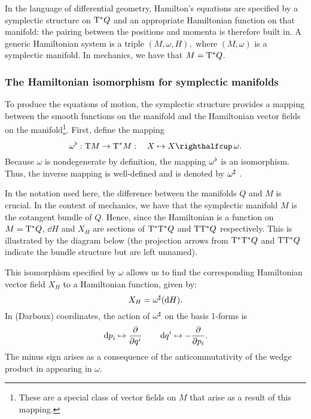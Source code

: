 In the language of differential geometry, Hamilton's equations are specified by a symplectic structure on \(\mathrm{T}^*Q\) and an appropriate Hamiltonian function on that manifold: the pairing between the positions and momenta is therefore built in. A generic Hamiltonian system is a triple \( (M, \omega, H), \) where \( (M, \omega) \) is a symplectic manifold. In mechanics, we have that \( M = \mathrm{T}^*Q \).

\subsubsection{The Hamiltonian isomorphism for symplectic manifolds}
To produce the equations of motion, the symplectic structure provides a mapping between the smooth functions on the manifold and the Hamiltonian vector fields on the manifold\footnote{These are a special class of vector fields on \(M\) that arise as a result of this mapping.}. First, define the mapping 
\begin{equation}
    \toDual{\omega}: \tbundle{M} \to \ctbundle{M}:\quad X \mapsto \intpr{X}{\omega}. 
    \label{eq:symplectic_isomorphism}
\end{equation}
Because \(\omega\) is nondegenerate by definition, the mapping \(\omega^\flat\) is an isomorphism. Thus, the inverse mapping is well-defined and is denoted by \(\omega^\sharp\) \cite{Libermann1987}.

In the notation used here, the difference between the manifolds \(Q\) and \(M\) is crucial. In the context of mechanics, we have that the symplectic manifold \(M\) is the cotangent bundle of \(Q\). Hence, since the Hamiltonian is a function on \(M = \mathrm{T}^*Q\), \(\dd{H}\) and \(X_H\) are sections of \(\mathrm{T}^*\mathrm{T}^*Q\) and \(\mathrm{T}\mathrm{T}^*Q\) respectively. This is illustrated by the diagram below (the projection arrows from \(\mathrm{T}^*\mathrm{T}^*Q\) and \(\mathrm{T}\mathrm{T}^*Q\) indicate the bundle structure but are left unnamed).
\begin{center}
\end{center}
This isomorphism specified by \(\omega\) allows us to find the corresponding Hamiltonian vector field \(X_H\) to a Hamiltonian function, given by:
\begin{equation} 
    X_H = \omega^\sharp(\dd{H}). 
    \label{eq:symplectic_hamiltonian_vf}
\end{equation}
In (Darboux) coordinates, the action of \( \omega^\sharp\) on the basis 1-forms is  
\begin{equation}
     \dd{p}_i \mapsto \pdv{}{q^i} \qquad \dd{q}^i \mapsto -\pdv{}{p_i}.
\end{equation} 
The minus sign arises as a consequence of the anticommutativity of the wedge product in appearing in \(\omega\).

